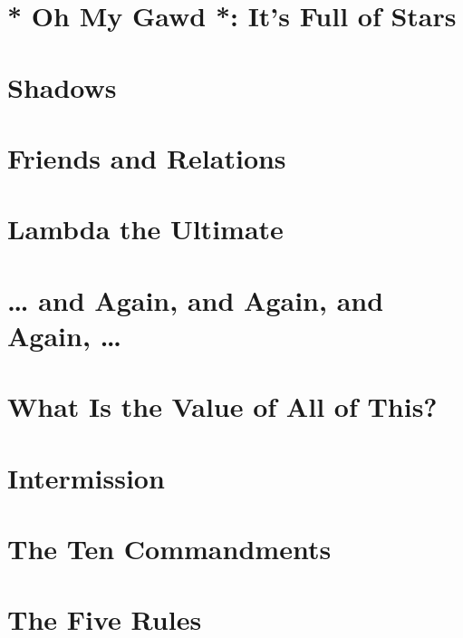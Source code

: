 \documentclass[11pt]{article}
\begin{document}
\newpage

\section{* Oh My Gawd *: It's Full of Stars}
\label{sec:org5a23cc0}

\newpage

\section{Shadows}
\label{sec:org0b1246c}

\newpage

\section{Friends and Relations}
\label{sec:org75612c1}

\newpage

\section{Lambda the Ultimate}
\label{sec:org4f2f05f}

\newpage

\section{\ldots{} and Again, and Again, and Again, \ldots{}}
\label{sec:org2b57c9d}

\newpage

\section{What Is the Value of All of This?}
\label{sec:orgf278596}

\newpage

\section{Intermission}
\label{sec:orgc8b0b26}

\newpage

\section{The Ten Commandments}
\label{sec:org6f93f3a}

\newpage

\section{The Five Rules}
\label{sec:org95d5ca3}

\newpage
\end{document}
